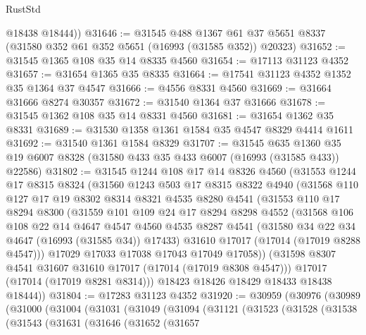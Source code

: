 \begin{lexlean}{RustStd}
\begin{coremodule}
        @18438
        @18444))
@31646 := @31545
    @488
    @1367
    @61
    @37
    @5651
    @8337
    (@31580 @352 @61 @352 @5651 (@16993 (@31585 @352)) @20323)
@31652 := @31545 @1365 @108 @35 @14 @8335 @4560
@31654 := @17113 @31123 @4352
@31657 := @31654 @1365 @35 @8335
@31664 := @17541 @31123 @4352 @1352 @35 @1364 @37 @4547
@31666 := @4556 @8331 @4560
@31669 := @31664 @31666 @8274 @30357
@31672 := @31540 @1364 @37 @31666
@31678 := @31545 @1362 @108 @35 @14 @8331 @4560
@31681 := @31654 @1362 @35 @8331
@31689 := @31530 @1358 @1361 @1584 @35 @4547 @8329 @4414 @1611
@31692 := @31540 @1361 @1584 @8329
@31707 := @31545
    @635
    @1360
    @35
    @19
    @6007
    @8328
    (@31580 @433 @35 @433 @6007 (@16993 (@31585 @433)) @22586)
@31802 := @31545
    @1244
    @108
    @17
    @14
    @8326
    @4560
    (@31553
      @1244
      @17
      @8315
      @8324
      (@31560
        @1243
        @503
        @17
        @8315
        @8322
        @4940
        (@31568
          @110
          @127
          @17
          @19
          @8302
          @8314
          @8321
          @4535
          @8280
          @4541
          (@31553
            @110
            @17
            @8294
            @8300
            (@31559
              @101
              @109
              @24
              @17
              @8294
              @8298
              @4552
              (@31568
                @106
                @108
                @22
                @14
                @4647
                @4547
                @4560
                @4535
                @8287
                @4541
                (@31580 @34 @22 @34 @4647 (@16993 (@31585 @34)) @17433)
                @31610
                @17017
                (@17014 (@17019 @8288 @4547)))
              @17029
              @17033
              @17038
              @17043
              @17049
              @17058))
          (@31598 @8307 @4541 @31607 @31610 @17017 (@17014 (@17019 @8308 @4547)))
          @17017
          (@17014 (@17019 @8281 @8314)))
        @18423
        @18426
        @18429
        @18433
        @18438
        @18444))
@31804 := @17283 @31123 @4352
@31920 := @30959
    (@30976
      (@30989
        (@31000
          (@31004
            (@31031
              (@31049
                (@31094
                  (@31121
                    (@31523
                      (@31528
                        (@31538
                          (@31543
                            (@31631
                              (@31646
                                (@31652
                                  (@31657

\end{coremodule}
\end{lexlean}
